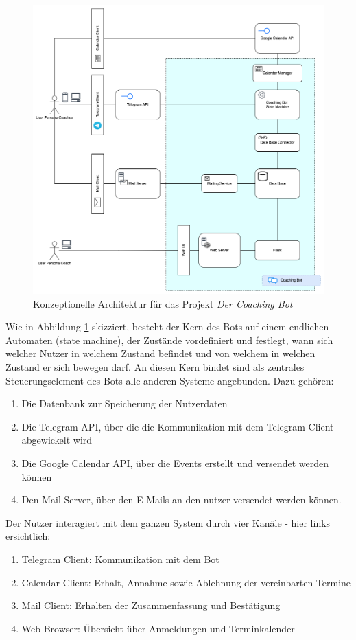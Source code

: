 	\begin{figure} %
		\centering
		\includegraphics[width=1.0\textwidth]{images/220320_PA28464_Architecture.png}
		\caption{Konzeptionelle Architektur für das Projekt \emph{Der Coaching Bot}}
		\label{fig: architecture}
	\end{figure}

	Wie in Abbildung \ref{fig: architecture} skizziert, besteht der Kern des Bots auf einem endlichen Automaten (state machine), der Zustände vordefiniert und festlegt, wann sich welcher Nutzer in welchem Zustand befindet und von welchem in welchen Zustand er sich bewegen darf. An diesen Kern bindet sind als zentrales Steuerungselement des Bots alle anderen Systeme angebunden. Dazu gehören:
	\begin{enumerate}
		\item Die Datenbank zur Speicherung der Nutzerdaten
		\item Die Telegram API, über die die Kommunikation mit dem Telegram Client abgewickelt wird
		\item Die Google Calendar API, über die Events erstellt und versendet werden können
		\item Den Mail Server, über den E-Mails an den nutzer versendet werden können.
	\end{enumerate} 

	Der Nutzer interagiert mit dem ganzen System durch vier Kanäle - hier links ersichtlich:
	\begin{enumerate}
		\item Telegram Client: Kommunikation mit dem Bot
		\item Calendar Client: Erhalt, Annahme sowie Ablehnung der vereinbarten Termine
		\item Mail Client: Erhalten der Zusammenfassung und Bestätigung
		\item Web Browser: Übersicht über Anmeldungen und Terminkalender
	\end{enumerate}

